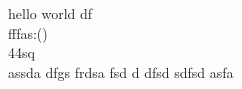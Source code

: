 \documentclass{article}
\begin{document}
	hello world df \textbf{\gitRel}\\
	fffas:\gitRoff(\gitCommitterDate)\\
	44sq
	\\
	assda dfgs
	frdsa fsd d dfsd sdfsd
	asfa
\end{document}
